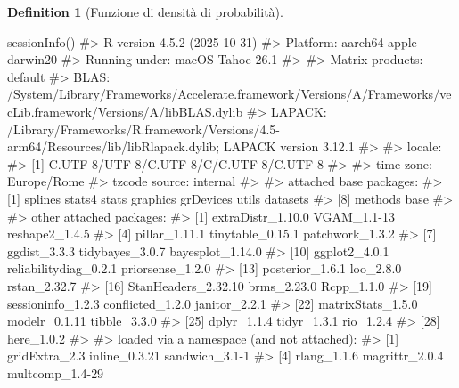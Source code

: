 \documentclass[
  letterpaper,
  DIV=11,
  numbers=noendperiod,
  oneside]{scrreprt}
\newenvironment{Shaded}{\begin{snugshade}}{\end{snugshade}}
\newcommand{\CommentTok}[1]{\textcolor[rgb]{0.37,0.37,0.37}{#1}}
\newcommand{\FunctionTok}[1]{\textcolor[rgb]{0.28,0.35,0.67}{#1}}
\newcommand{\NormalTok}[1]{\textcolor[rgb]{0.00,0.23,0.31}{#1}}
\theoremstyle{definition}
\theoremstyle{plain}
\theoremstyle{definition}
\newtheorem{definition}{Definition}[chapter]
\theoremstyle{remark}
\begin{document}
\begin{definition}[Funzione di densità di
probabilità]
\begin{tcolorbox}
\begin{Shaded}
\begin{Highlighting}[]
\FunctionTok{sessionInfo}\NormalTok{()}
\CommentTok{\#\textgreater{} R version 4.5.2 (2025{-}10{-}31)}
\CommentTok{\#\textgreater{} Platform: aarch64{-}apple{-}darwin20}
\CommentTok{\#\textgreater{} Running under: macOS Tahoe 26.1}
\CommentTok{\#\textgreater{} }
\CommentTok{\#\textgreater{} Matrix products: default}
\CommentTok{\#\textgreater{} BLAS:   /System/Library/Frameworks/Accelerate.framework/Versions/A/Frameworks/vecLib.framework/Versions/A/libBLAS.dylib }
\CommentTok{\#\textgreater{} LAPACK: /Library/Frameworks/R.framework/Versions/4.5{-}arm64/Resources/lib/libRlapack.dylib;  LAPACK version 3.12.1}
\CommentTok{\#\textgreater{} }
\CommentTok{\#\textgreater{} locale:}
\CommentTok{\#\textgreater{} [1] C.UTF{-}8/UTF{-}8/C.UTF{-}8/C/C.UTF{-}8/C.UTF{-}8}
\CommentTok{\#\textgreater{} }
\CommentTok{\#\textgreater{} time zone: Europe/Rome}
\CommentTok{\#\textgreater{} tzcode source: internal}
\CommentTok{\#\textgreater{} }
\CommentTok{\#\textgreater{} attached base packages:}
\CommentTok{\#\textgreater{} [1] splines   stats4    stats     graphics  grDevices utils     datasets }
\CommentTok{\#\textgreater{} [8] methods   base     }
\CommentTok{\#\textgreater{} }
\CommentTok{\#\textgreater{} other attached packages:}
\CommentTok{\#\textgreater{}  [1] extraDistr\_1.10.0     VGAM\_1.1{-}13           reshape2\_1.4.5       }
\CommentTok{\#\textgreater{}  [4] pillar\_1.11.1         tinytable\_0.15.1      patchwork\_1.3.2      }
\CommentTok{\#\textgreater{}  [7] ggdist\_3.3.3          tidybayes\_3.0.7       bayesplot\_1.14.0     }
\CommentTok{\#\textgreater{} [10] ggplot2\_4.0.1         reliabilitydiag\_0.2.1 priorsense\_1.2.0     }
\CommentTok{\#\textgreater{} [13] posterior\_1.6.1       loo\_2.8.0             rstan\_2.32.7         }
\CommentTok{\#\textgreater{} [16] StanHeaders\_2.32.10   brms\_2.23.0           Rcpp\_1.1.0           }
\CommentTok{\#\textgreater{} [19] sessioninfo\_1.2.3     conflicted\_1.2.0      janitor\_2.2.1        }
\CommentTok{\#\textgreater{} [22] matrixStats\_1.5.0     modelr\_0.1.11         tibble\_3.3.0         }
\CommentTok{\#\textgreater{} [25] dplyr\_1.1.4           tidyr\_1.3.1           rio\_1.2.4            }
\CommentTok{\#\textgreater{} [28] here\_1.0.2           }
\CommentTok{\#\textgreater{} }
\CommentTok{\#\textgreater{} loaded via a namespace (and not attached):}
\CommentTok{\#\textgreater{}  [1] gridExtra\_2.3         inline\_0.3.21         sandwich\_3.1{-}1       }
\CommentTok{\#\textgreater{}  [4] rlang\_1.1.6           magrittr\_2.0.4        multcomp\_1.4{-}29      }

\end{Highlighting}
\end{Shaded}
\end{tcolorbox}
\end{definition}
\end{document}
